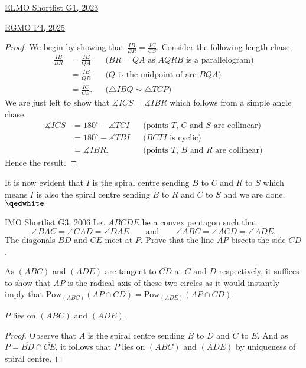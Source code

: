 \begin{problem}{14}{\href{https://artofproblemsolving.com/community/c6h3100572p28033718}{ELMO Shortlist G1, 2023}}
\begin{problem}{7}{\href{https://artofproblemsolving.com/community/q2h3548106p35507758}{EGMO P4, 2025}}
\begin{solution}
	\begin{proof} We begin by showing that $\frac{IB}{BR}=\frac{IC}{CS}$. Consider the following length chase.
\begin{align*} \frac{IB}{BR}&=\frac{IB}{QA} && \text{($BR=QA$ as $AQRB$ is a parallelogram)}\\ &=\frac{IB}{QB} && \text{($Q$ is the midpoint of arc $BQA$)}\\ &=\frac{IC}{CS}.&& \text{($\triangle IBQ\sim \triangle TCP$)} \end{align*}We are just left to show that $\measuredangle ICS=\measuredangle IBR$ which follows from a simple angle chase.
\begin{align*} \measuredangle ICS&=180^{\circ}-\measuredangle TCI &&\text{(points $T$, $C$ and $S$ are collinear)}\\ &=180^{\circ}-\measuredangle TBI && \text{($BCTI$ is cyclic)}\\ &=\measuredangle IBR. && \text{(points $T$, $B$ and $R$ are collinear)} \end{align*}Hence the result.
	\end{proof}

	It is now evident that $I$ is the spiral centre sending $B$ to $C$ and $R$ to $S$ which means $I$ is also the spiral centre sending $B$ to $R$ and $C$ to $S$ and we are done. $\qedwhite$
	\end{solution}
\end{problem}

\begin{problem}{8}{\href{https://artofproblemsolving.com/community/q2h130813p35493023}{IMO Shortlist G3, 2006}} 
	Let $ ABCDE$ be a convex pentagon such that
\[ \angle BAC = \angle CAD = \angle DAE\qquad \text{and}\qquad \angle ABC = \angle ACD = \angle ADE. \]The diagonals $BD$ and $CE$ meet at $P$. Prove that the line $AP$ bisects the side $CD$.
	\begin{solution} As $(ABC)$ and $(ADE)$ are tangent to $\overline{CD}$ at $C$ and $D$ respectively, it suffices to show that $AP$ is the radical axis of these two circles as it would instantly imply that $\text{Pow}_{(ABC)}(AP\cap CD)=\text{Pow}_{(ADE)}(AP\cap CD)$.

	\begin{numclaim}{1} $P$ lies on $(ABC)$ and $(ADE)$.
	\end{numclaim}
	\begin{proof} Observe that $A$ is the spiral centre sending $B$ to $D$ and $C$ to $E$. And as $P=\overline{BD}\cap \overline{CE}$, it follows that $P$ lies on $(ABC)$ and $(ADE)$ by uniqueness of spiral centre.
	\end{proof}


\end{solution}
\end{problem}
\end{problem}
